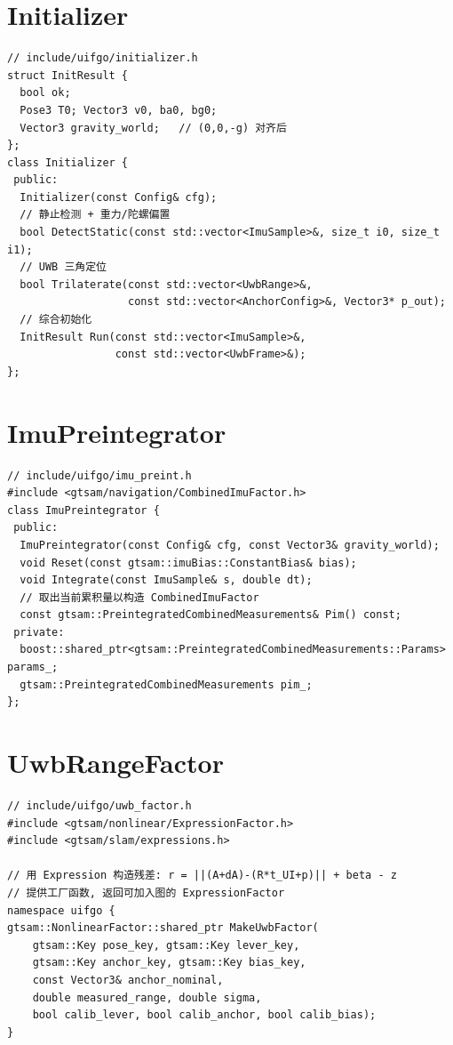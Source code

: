 \documentclass[11pt,a4paper]{report}
\begin{document}
\section{Initializer}
\begin{lstlisting}[style=cpp]
// include/uifgo/initializer.h
struct InitResult {
  bool ok;
  Pose3 T0; Vector3 v0, ba0, bg0;
  Vector3 gravity_world;   // (0,0,-g) 对齐后
};
class Initializer {
 public:
  Initializer(const Config& cfg);
  // 静止检测 + 重力/陀螺偏置
  bool DetectStatic(const std::vector<ImuSample>&, size_t i0, size_t i1);
  // UWB 三角定位
  bool Trilaterate(const std::vector<UwbRange>&,
                   const std::vector<AnchorConfig>&, Vector3* p_out);
  // 综合初始化
  InitResult Run(const std::vector<ImuSample>&,
                 const std::vector<UwbFrame>&);
};
\end{lstlisting}

\section{ImuPreintegrator}
\begin{lstlisting}[style=cpp]
// include/uifgo/imu_preint.h
#include <gtsam/navigation/CombinedImuFactor.h>
class ImuPreintegrator {
 public:
  ImuPreintegrator(const Config& cfg, const Vector3& gravity_world);
  void Reset(const gtsam::imuBias::ConstantBias& bias);
  void Integrate(const ImuSample& s, double dt);
  // 取出当前累积量以构造 CombinedImuFactor
  const gtsam::PreintegratedCombinedMeasurements& Pim() const;
 private:
  boost::shared_ptr<gtsam::PreintegratedCombinedMeasurements::Params> params_;
  gtsam::PreintegratedCombinedMeasurements pim_;
};
\end{lstlisting}

\section{UwbRangeFactor}
\begin{lstlisting}[style=cpp]
// include/uifgo/uwb_factor.h
#include <gtsam/nonlinear/ExpressionFactor.h>
#include <gtsam/slam/expressions.h>

// 用 Expression 构造残差: r = ||(A+dA)-(R*t_UI+p)|| + beta - z
// 提供工厂函数, 返回可加入图的 ExpressionFactor
namespace uifgo {
gtsam::NonlinearFactor::shared_ptr MakeUwbFactor(
    gtsam::Key pose_key, gtsam::Key lever_key,
    gtsam::Key anchor_key, gtsam::Key bias_key,
    const Vector3& anchor_nominal,
    double measured_range, double sigma,
    bool calib_lever, bool calib_anchor, bool calib_bias);
}
\end{lstlisting}
\end{document}
